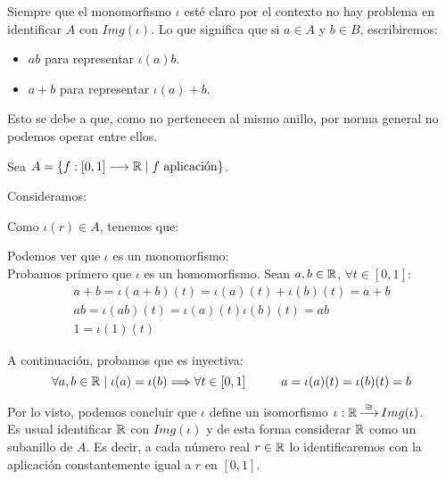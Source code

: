 Siempre que el monomorfismo $\iota$ esté claro por el contexto no hay problema en identificar $A$ con $Img(\iota)$. Lo que
significa que si $a\in A$ y $b \in B$, escribiremos:
\begin{itemize}
    \item $ab$ para representar $\iota(a)b$.
    \item $a+b$ para representar $\iota(a)+b$.
\end{itemize}
Esto se debe a que, como no pertenecen al mismo anillo, por norma general no podemos operar entre ellos.

\begin{ejemplo}
    Sea $A = \{f:[0,1]\longrightarrow \mathbb R \mid f \mbox{ aplicación}\}$.
    
    Consideramos:

    Como $\iota(r)\in A$, tenemos que:
    
    Podemos ver que $\iota$ es un monomorfismo:\\

    
    Probamos primero que $\iota$ es un homomorfismo. Sean $a,b \in \mathbb R$, $\forall t \in [0,1]$:
    \begin{gather*}
        a+b = \iota(a+b)(t) = \iota(a)(t) + \iota(b)(t) = a+b \\
        ab = \iota(ab)(t) = \iota(a)(t) \iota(b)(t) = ab \\
        1 = \iota(1)(t)
    \end{gather*}
    
    A continuación, probamos que es inyectiva:
    $$\forall a,b \in \mathbb R \mid \iota(a) = \iota(b) \Longrightarrow \forall t \in [0,1] \hspace{1cm} a=\iota(a)(t)=\iota(b)(t) = b$$

    
    Por lo visto, podemos concluir que $\iota$ define un isomorfismo $\displaystyle \iota:\mathbb R \mathop{\longrightarrow}^{\cong}
        Img(\iota)$.\\
        
    Es usual identificar $\mathbb R$ con $Img(\iota)$ y de esta forma considerar $\mathbb R$ como un subanillo de $A$. Es decir, a cada número real $r \in \mathbb R$ lo identificaremos con la aplicación constantemente igual a $r$ en $[0,1]$.
\end{ejemplo}

